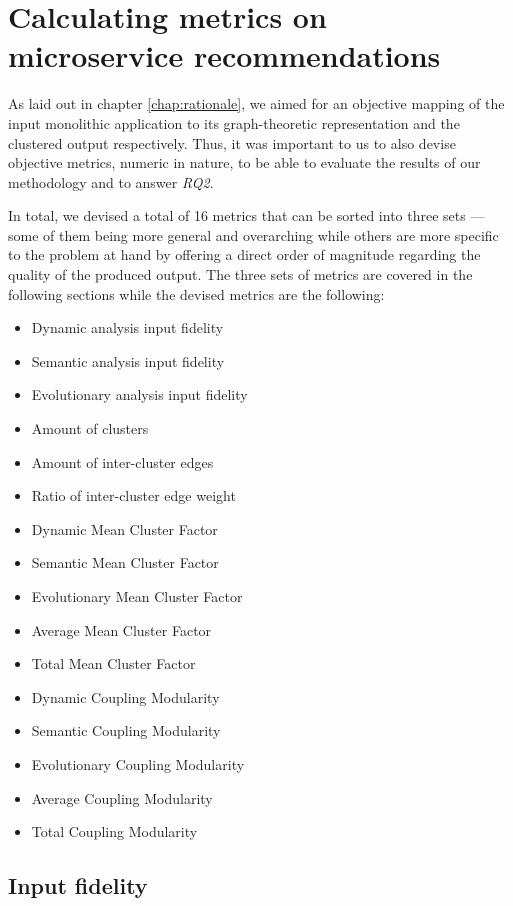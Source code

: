 \documentclass[12pt,a4paper]{report}
\begin{document}
\chapter{Calculating metrics on microservice recommendations} \label{chap:metrics}

As laid out in chapter \ref{chap:rationale}, we aimed for an objective
mapping of the input monolithic application to its graph-theoretic representation
and the clustered output respectively.
Thus, it was important to us to also devise objective metrics, numeric in nature,
to be able to evaluate the results of our methodology and to answer \textit{RQ2}.

In total, we devised a total of 16 metrics that can be sorted into three sets ---
some of them being more general and overarching while others are more specific
to the problem at hand by offering a direct order of magnitude regarding the
quality of the produced output. The three sets of metrics are covered
in the following sections while the devised metrics are the following:
\begin{itemize}
  \item Dynamic analysis input fidelity
  \item Semantic analysis input fidelity
  \item Evolutionary analysis input fidelity
  \item Amount of clusters
  \item Amount of inter-cluster edges
  \item Ratio of inter-cluster edge weight
  \item Dynamic Mean Cluster Factor
  \item Semantic Mean Cluster Factor
  \item Evolutionary Mean Cluster Factor
  \item Average Mean Cluster Factor
  \item Total Mean Cluster Factor
  \item Dynamic Coupling Modularity
  \item Semantic Coupling Modularity
  \item Evolutionary Coupling Modularity
  \item Average Coupling Modularity
  \item Total Coupling Modularity
\end{itemize}



\section{Input fidelity} \label{sect:input-fidelity-metrics}
\end{document}
